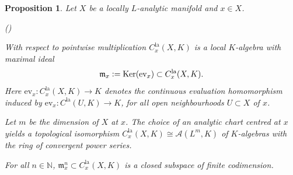 \documentclass[a4paper, reqno, 10pt]{amsart}
\newtheorem{proposition}[theorem]{Proposition}
\theoremstyle{definition}
\newenvironment{altenumerate}
	{\begin{list}
		{\textup{(\theenumi)} }
		{\usecounter{enumi}
			\setlength{\labelwidth}{0pt}
			\setlength{\labelsep}{0pt}
			\setlength{\leftmargin}{0pt}
			\setlength{\itemsep}{0pt}
			\setlength{\topsep}{0pt}
		\renewcommand{\theenumi}{\roman{enumi}}
		}}
	{\end{list}}
\numberwithin{equation}{section}
\newcommand{\defeq}{\vcentcolon=}
\newcommand{\Ker}{{\mathrm{Ker}}}
\newcommand{\la}{{\mathrm{la}}}
\newcommand{\ra}{\rightarrow}
\newcommand{\BN}{{\mathbb {N}}}
\newcommand{\CA}{{\mathcal {A}}}
\newcommand{\Fm}{{\mathfrak {m}}}
\begin{document}
\begin{proposition}\label{Prop 1 - Properties of the algebra of germs of locally analytic functions}
	Let $X$ be a locally $L$-analytic manifold and $x\in X$.
	\begin{altenumerate}
		\item
		With respect to pointwise multiplication $C^\la_x(X,K)$ is a local $K$-algebra with maximal ideal
		\begin{equation*}
			\Fm_x \defeq \Ker (\mathrm{ev}_x) \subset C^\la_x(X,K).
		\end{equation*}
		Here $\mathrm{ev}_x \colon C^\la_x(X,K) \ra K$ denotes the continuous evaluation homomorphism induced by $\mathrm{ev}_x\colon C^\la(U,K)\ra K$, for all open neighbourhoods $U\subset X$ of $x$.
		\item
		Let $m$ be the dimension of $X$ at $x$.
		The choice of an analytic chart centred at $x$ yields a topological isomorphism $C^\la_x(X,K) \cong \CA(L^m,K)$ of $K$-algebras with the ring of convergent power series.
		\item
		For all $n\in \BN$, $\Fm_x^n \subset C^\la_x(X,K)$ is a closed subspace of finite codimension.
	\end{altenumerate}
\end{proposition}
\end{document}
